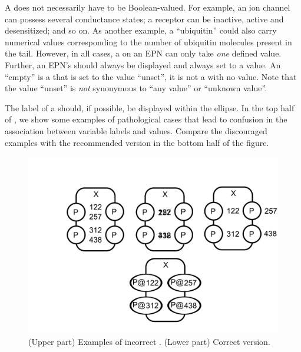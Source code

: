 A  does not necessarily have to be Boolean-valued.  For example, an ion channel can possess several conductance states; a receptor can be inactive, active and desensitized; and so on.  As another example, a  ``ubiquitin'' could also carry numerical values corresponding to the number of ubiquitin molecules present in the tail.  However, in all cases, a  on an EPN can only take \emph{one} defined value.  Further, an EPN's  should always be displayed and always set to a value.  An ``empty''  is a  that is set to the value ``unset'', it is not a  with no value. Note that the value ``unset'' is \emph{not} synonymous to ``any value'' or ``unknown value''.

The label of a  should, if possible, be displayed within the ellipse.  In the top half of , we show some examples of pathological cases that lead to confusion in the association between variable labels and values.  Compare the discouraged examples with the recommended version in the bottom half of the figure.

\begin{figure}[H]
  \centering
  \includegraphics[scale = 0.3, trim = 0 0.5in 0 0.75in]{examples/wrongStateVariables}
  \caption{(Upper part) Examples of incorrect .  (Lower part)
    Correct version.}
  \label{fig:wrong-state-var}
\end{figure}





